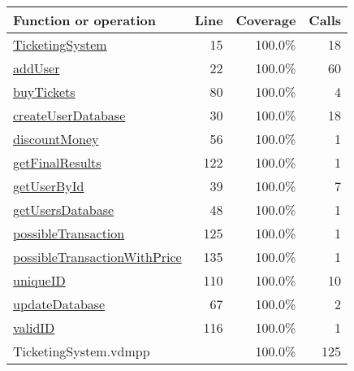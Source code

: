 \begin{longtable}{|l|r|r|r|}
\hline
Function or operation & Line & Coverage & Calls \\
\hline
\hline
\hyperref[TicketingSystem:15]{TicketingSystem} & 15&100.0\% & 18 \\
\hline
\hyperref[addUser:22]{addUser} & 22&100.0\% & 60 \\
\hline
\hyperref[buyTickets:80]{buyTickets} & 80&100.0\% & 4 \\
\hline
\hyperref[createUserDatabase:30]{createUserDatabase} & 30&100.0\% & 18 \\
\hline
\hyperref[discountMoney:56]{discountMoney} & 56&100.0\% & 1 \\
\hline
\hyperref[getFinalResults:122]{getFinalResults} & 122&100.0\% & 1 \\
\hline
\hyperref[getUserById:39]{getUserById} & 39&100.0\% & 7 \\
\hline
\hyperref[getUsersDatabase:48]{getUsersDatabase} & 48&100.0\% & 1 \\
\hline
\hyperref[possibleTransaction:125]{possibleTransaction} & 125&100.0\% & 1 \\
\hline
\hyperref[possibleTransactionWithPrice:135]{possibleTransactionWithPrice} & 135&100.0\% & 1 \\
\hline
\hyperref[uniqueID:110]{uniqueID} & 110&100.0\% & 10 \\
\hline
\hyperref[updateDatabase:67]{updateDatabase} & 67&100.0\% & 2 \\
\hline
\hyperref[validID:116]{validID} & 116&100.0\% & 1 \\
\hline
\hline
TicketingSystem.vdmpp & & 100.0\% & 125 \\
\hline
\end{longtable}

